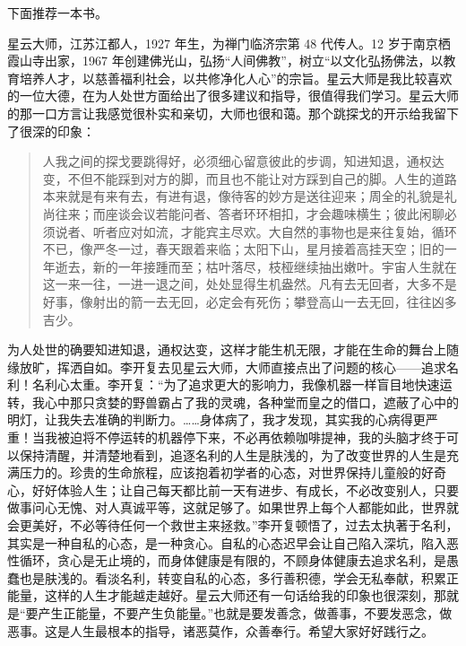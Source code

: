 下面推荐一本书。

\begin{book}[《星云大师谈处世》]
    星云大师，江苏江都人，1927 年生，为禅门临济宗第 48 代传人。12 岁于南京栖霞山寺出家，1967 年创建佛光山，弘扬“人间佛教”，树立“以文化弘扬佛法，以教育培养人才，以慈善福利社会，以共修净化人心”的宗旨。星云大师是我比较喜欢的一位大德，在为人处世方面给出了很多建议和指导，很值得我们学习。星云大师的那一口方言让我感觉很朴实和亲切，大师也很和蔼。那个跳探戈的开示给我留下了很深的印象：\begin{quote}
        人我之间的探戈要跳得好，必须细心留意彼此的步调，知进知退，通权达变，不但不能踩到对方的脚，而且也不能让对方踩到自己的脚。人生的道路本来就是有来有去，有进有退，像待客的妙方是送往迎来；周全的礼貌是礼尚往来；而座谈会议若能问者、答者环环相扣，才会趣味横生；彼此闲聊必须说者、听者应对如流，才能宾主尽欢。大自然的事物也是来往复始，循环不已，像严冬一过，春天跟着来临；太阳下山，星月接着高挂天空；旧的一年逝去，新的一年接踵而至；枯叶落尽，枝桠继续抽出嫩叶。宇宙人生就在这一来一往，一进一退之间，处处显得生机盎然。凡有去无回者，大多不是好事，像射出的箭一去无回，必定会有死伤；攀登高山一去无回，往往凶多吉少。
    \end{quote} 为人处世的确要知进知退，通权达变，这样才能生机无限，才能在生命的舞台上随缘放旷，挥洒自如。李开复去见星云大师，大师直接点出了问题的核心——追求名利！名利心太重。李开复：“为了追求更大的影响力，我像机器一样盲目地快速运转，我心中那只贪婪的野兽霸占了我的灵魂，各种堂而皇之的借口，遮蔽了心中的明灯，让我失去准确的判断力。……身体病了，我才发现，其实我的心病得更严重！当我被迫将不停运转的机器停下来，不必再依赖咖啡提神，我的头脑才终于可以保持清醒，并清楚地看到，追逐名利的人生是肤浅的，为了改变世界的人生是充满压力的。珍贵的生命旅程，应该抱着初学者的心态，对世界保持儿童般的好奇心，好好体验人生；让自己每天都比前一天有进步、有成长，不必改变别人，只要做事问心无愧、对人真诚平等，这就足够了。如果世界上每个人都能如此，世界就会更美好，不必等待任何一个救世主来拯救。”李开复顿悟了，过去太执著于名利，其实是一种自私的心态，是一种贪心。自私的心态迟早会让自己陷入深坑，陷入恶性循环，贪心是无止境的，而身体健康是有限的，不顾身体健康去追求名利，是愚蠢也是肤浅的。看淡名利，转变自私的心态，多行善积德，学会无私奉献，积累正能量，这样的人生才能越走越好。星云大师还有一句话给我的印象也很深刻，那就是“要产生正能量，不要产生负能量。”也就是要发善念，做善事，不要发恶念，做恶事。这是人生最根本的指导，诸恶莫作，众善奉行。希望大家好好践行之。
\end{book}
